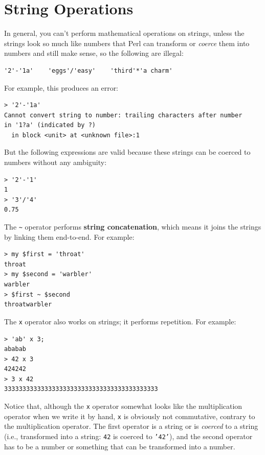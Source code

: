 \section{String Operations}
\label{string_operations}

In general, you can't perform mathematical operations on strings, unless
the strings look so much like numbers that Perl can transform or \emph{coerce} them into numbers and still make sense, so the 
following are illegal:

\begin{verbatim}
'2'-'1a'    'eggs'/'easy'    'third'*'a charm'
\end{verbatim}
%

For example, this produces an error:

\begin{verbatim}
> '2'-'1a'
Cannot convert string to number: trailing characters after number 
in '1?a' (indicated by ?)
  in block <unit> at <unknown file>:1
\end{verbatim}
%
  
But the following expressions are valid because these strings 
can be coerced to numbers without any ambiguity:
\begin{verbatim}
> '2'-'1'
1
> '3'/'4'
0.75
\end{verbatim}
%

The \verb'~' operator performs {\bf string concatenation}, which means
it joins the strings by linking them end-to-end.  For example:

\begin{verbatim}
> my $first = 'throat'
throat
> my $second = 'warbler'
warbler
> $first ~ $second
throatwarbler
\end{verbatim}
%
The {\tt x} operator also works on strings; it performs repetition.
For example:

\begin{verbatim}
> 'ab' x 3;
ababab
> 42 x 3
424242
> 3 x 42
333333333333333333333333333333333333333333
\end{verbatim}

Notice that, although the {\tt x} operator somewhat looks like 
the multiplication operator when we write it by hand, {\tt x} 
is obviously not commutative, contrary to the {\tt *} 
multiplication operator. The first operator is a string or is 
\emph{coerced} to a string (i.e., transformed into a string: 
{\tt 42} is coerced to {\tt '42'}), and the second operator 
has to be a number or something that can be transformed 
into a number.


